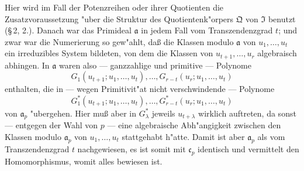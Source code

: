 Hier wird im Fall der Potenzreihen oder ihrer Quotienten die Zusatzvoraussetzung "uber die Struktur des Quotientenk"orpers $\mathfrak{Q}$ von $\mathfrak{I}$ benutzt (\S\,2, 2.). Danach war das Primideal $\mathfrak{a}$ in jedem Fall vom Transzendenzgrad $t$; und zwar war die Numerierung so gew"ahlt, da\ss{} die Klassen modulo $\mathfrak{a}$ von $u_1,\ldots,u_t$ ein irreduzibles System bildeten, von dem die Klassen von $u_{t+1},\ldots,u_r$ algebraisch abhingen. In $\mathfrak{a}$ waren also --- ganzzahlige und primitive --- Polynome
\[
G_1(u_{t+1};u_1,\ldots,u_t),\ldots,G_{r-t}(u_r;u_1,\ldots,u_t)\tag{1}
\]
enthalten, die in --- wegen Primitivit"at nicht verschwindende --- Polynome
\[
G^*_1(u_{t+1};u_1,\ldots,u_t),\ldots,G^*_{r-t}(u_r;u_1,\ldots,u_t)\tag{2}
\]
von $\mathfrak{a}_p$ "ubergehen. Hier mu\ss{} aber in $G^*_\lambda$ jeweils $u_{t+\lambda}$ wirklich auftreten, da sonst --- entgegen der Wahl von $p$ --- eine algebraische Abh"angigkeit zwischen den Klassen modulo $\mathfrak{a}_p$ von $u_1,\ldots,u_t$ stattgehabt h"atte. Damit ist aber $\mathfrak{a}_p$ als vom Transzendenzgrad $t$ nachgewiesen, es ist somit mit $\mathfrak{c}_p$ identisch und vermittelt den Homomorphismus, womit alles bewiesen ist.

